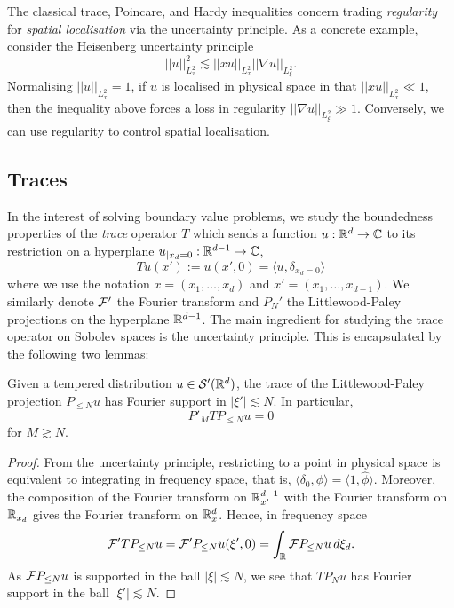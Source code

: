 The classical trace, Poincare, and Hardy inequalities concern trading \textit{regularity} for \textit{spatial localisation} via the uncertainty principle. As a concrete example, consider the Heisenberg uncertainty principle
	\begin{equation} ||u||_{L^2_x}^2 \lesssim ||x u||_{L^2_x} ||\nabla u||_{L^2_\xi}. \tag{*}\label{eq:heisen}
	\end{equation}
Normalising $||u||_{L^2_x} = 1$, if $u$ is localised in physical space in that $||xu||_{L^2_x} \ll 1$, then the inequality above forces a loss in regularity $||\nabla u||_{L^2_\xi}\gg 1$. Conversely, we can use regularity to control spatial localisation. 

\subsection{Traces}

In the interest of solving boundary value problems, we study the boundedness properties of the \emph{trace} operator $T$ which sends a function $u : \mathbb R^d \to \mathbb C$ to its restriction on a hyperplane $u_{|x_d = 0} : \mathbb R^{d - 1} \to \mathbb C$, 
	\[ T u (x') := u(x', 0) = \langle u, \delta_{x_d = 0} \rangle \]
where we use the notation $x = (x_1, \dots, x_d)$ and $x' = (x_1, \dots, x_{d - 1})$. We similarly denote $\mathcal F'$ the Fourier transform and $P_N'$ the Littlewood-Paley projections on the hyperplane $\mathbb R^{d - 1}$. The main ingredient for studying the trace operator on Sobolev spaces is the uncertainty principle. This is encapsulated by the following two lemmas: 

\begin{lemma}
	Given a tempered distribution $u \in \mathcal S' (\mathbb R^d)$, the trace of the Littlewood-Paley projection $P_{\leq N} u$ has Fourier support in $|\xi'| \lesssim N$. In particular, 
		\[ P'_M T P_{\leq N} u = 0 \]
	for $M \gtrsim N$. 
\end{lemma}

\begin{proof}
	From the uncertainty principle, restricting to a point in physical space is equivalent to integrating in frequency space, that is, $\langle \delta_0, \phi \rangle = \langle 1, \widehat \phi \rangle$. Moreover, the composition of the Fourier transform on $\mathbb R^{d - 1}_{x'}$ with the Fourier transform on $\mathbb R_{x_d}$ gives the Fourier transform on $\mathbb R^d_x$. Hence, in frequency space
		\[ \mathcal F' T P_{\leq N} u = \mathcal F' P_{\leq N} u (\xi', 0) = \int_\mathbb R \mathcal F P_{\leq N} u \, d\xi_d. \]
	As $\mathcal F P_{\leq N} u$ is supported in the ball $|\xi| \lesssim N$, we see that $T P_N u$ has Fourier support in the ball $|\xi'| \lesssim N$. 	
\end{proof}

